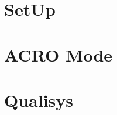 \documentclass[3p,times]{article}
\begin{document}
	
		
	
	\newpage
	\section{SetUp}
		
	
	\newpage
	\section{ACRO Mode}
	
	
	\newpage
	\section{Qualisys}
	
	
	\newpage
	
	
%	
	
	\clearpage
		
\end{document}
